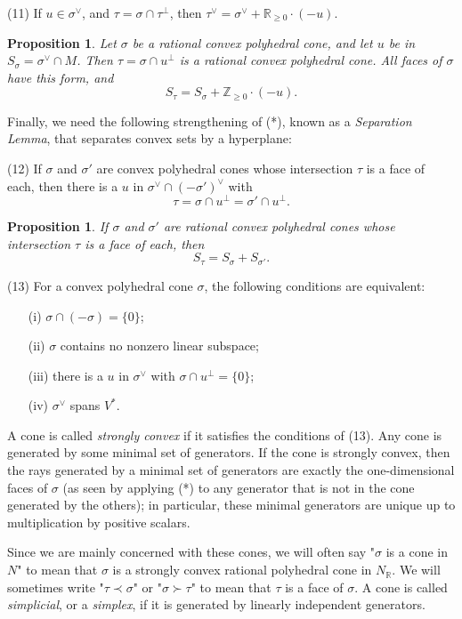 \documentclass[10pt,a4paper]{book}
\newtheorem{prop}[thm]{Proposition}
\begin{document}
\medskip
\noindent (11) If $u\in \sigma^\vee$, and $\tau = \sigma\cap \tau^\perp$, then $\tau^\vee = \sigma^\vee + \mathbb{R}_{\geq 0}\cdot (-u)$.
\medskip

\begin{prop} Let $\sigma$ be a rational convex polyhedral cone, and let $u$ be in $S_\sigma=\sigma^\vee\cap  M$. Then $\tau = \sigma\cap u^\perp$ is a rational convex polyhedral cone. All faces of $\sigma$ have this form, and 
\[
S_\tau = S_\sigma + \mathbb{Z}_{\geq 0}\cdot(-u).
\]
\end{prop}

Finally, we need the following strengthening of (*), known as a \textit{Separation Lemma}, that separates convex sets by a hyperplane:

\medskip
\noindent (12) If $\sigma$ and $\sigma'$ are convex polyhedral cones whose intersection $\tau$ is a face of each, then there is a $u$ in $\sigma^\vee \cap (-\sigma')^\vee$ with
\[
\tau = \sigma \cap u^\perp  = \sigma'\cap u^\perp.
\]
\medskip


\begin{prop} If $\sigma$ and $\sigma'$ are rational convex polyhedral cones whose intersection $\tau$ is a face of each, then
\[
S_\tau = S_\sigma + S_{\sigma'}.
\]
\end{prop}	

\medskip
\noindent (13) For a convex polyhedral cone $\sigma$, the following conditions are equivalent:
\begin{itemize}
\item[(i)] $\sigma\cap (-\sigma) = \{0\}$;
\item[(ii)] $\sigma$ contains no nonzero linear subspace;
\item[(iii)] there is a $u$ in $\sigma^\vee$ with $\sigma\cap u^\perp = \{0\}$;
\item[(iv)] $\sigma^\vee$ spans $V^*.$ 
\end{itemize}
\medskip

A cone is called \textit{strongly convex} if it satisfies the conditions of (13). Any cone is generated by some minimal set of generators. If the cone is strongly convex, then the rays generated by a minimal set of generators are exactly the one-dimensional faces of $\sigma$ (as seen by applying (*) to any generator that is not in the cone generated by the others); in particular, these minimal generators are unique up to multiplication by positive scalars.

Since we are mainly concerned with these cones, we will often say "$\sigma$ is a cone in $N$" to mean that $\sigma$ is a strongly convex rational polyhedral cone in $N_\mathbb{R}$. We will sometimes write "$\tau \prec \sigma$" or "$\sigma \succ \tau$" to mean that $\tau$ is a face of $\sigma$. A cone is called \textit{simplicial}, or a \textit{simplex}, if it is generated by linearly independent generators.
\end{document}
